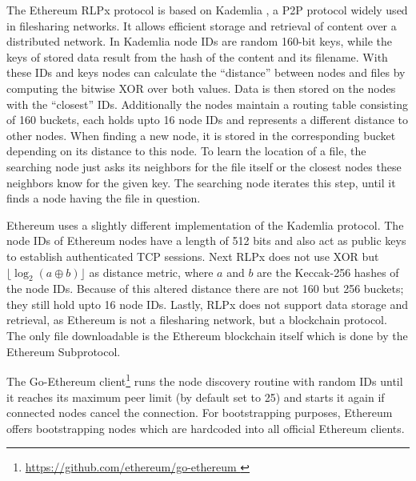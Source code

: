 \documentclass[10pt,conference,final]{IEEEtran}
\begin{document}
The Ethereum RLPx protocol is based on Kademlia \cite{15}, a P2P protocol widely used in filesharing networks.
It allows efficient storage and retrieval of content over a distributed network.
In Kademlia node IDs are random 160-bit keys, while the keys of stored data result from the hash of the content and its filename.
With these IDs and keys nodes can calculate the ``distance'' between nodes and files by computing the bitwise XOR over both values.
Data is then stored on the nodes with the ``closest'' IDs.
Additionally the nodes maintain a routing table consisting of 160 buckets, each holds upto 16 node IDs and represents a different distance to other nodes.
When finding a new node, it is stored in the corresponding bucket depending on its distance to this node.
To learn the location of a file, the searching node just asks its neighbors for the file itself or the closest nodes these neighbors know for the given key.
The searching node iterates this step, until it finds a node having the file in question.

Ethereum uses a slightly different implementation of the Kademlia protocol.
The node IDs of Ethereum nodes have a length of 512 bits and also act as public keys to establish authenticated TCP sessions.
Next RLPx does not use XOR but \(\lfloor\log_{2}(a \oplus b)\rfloor\) as distance metric, where \(a\) and \(b\) are the Keccak-256 hashes of the node IDs.
Because of this altered distance there are not 160 but 256 buckets; they still hold upto 16 node IDs.
Lastly, RLPx does not support data storage and retrieval, as Ethereum is not a filesharing network, but a blockchain protocol.
The only file downloadable is the Ethereum blockchain itself which is done by the Ethereum Subprotocol.\cite{13}

The Go-Ethereum client\footnote{\url{https://github.com/ethereum/go-ethereum }} runs the node discovery routine with random IDs until it reaches its maximum peer limit (by default set to 25) and starts it again if connected nodes cancel the connection.
For bootstrapping purposes, Ethereum offers bootstrapping nodes which are hardcoded into all official Ethereum clients.

\vspace{1mm}
\end{document}
